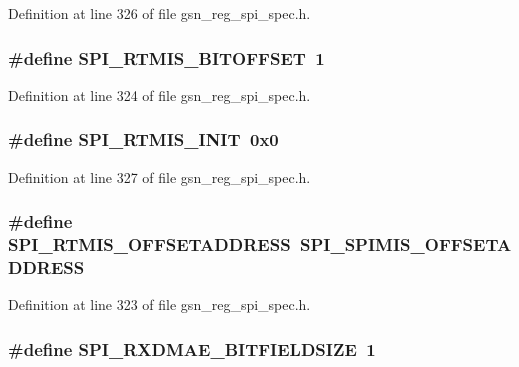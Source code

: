 Definition at line 326 of file gsn\_\-reg\_\-spi\_\-spec.h.

\hypertarget{a00573_a405ac4f8c1a2839580c374beb3ee0a61}{
\subsubsection[{SPI\_\-RTMIS\_\-BITOFFSET}]{\setlength{\rightskip}{0pt plus 5cm}\#define SPI\_\-RTMIS\_\-BITOFFSET~1}}
\label{a00573_a405ac4f8c1a2839580c374beb3ee0a61}


Definition at line 324 of file gsn\_\-reg\_\-spi\_\-spec.h.

\hypertarget{a00573_a476f42f80088901623eb6d094aa81ffd}{
\subsubsection[{SPI\_\-RTMIS\_\-INIT}]{\setlength{\rightskip}{0pt plus 5cm}\#define SPI\_\-RTMIS\_\-INIT~0x0}}
\label{a00573_a476f42f80088901623eb6d094aa81ffd}


Definition at line 327 of file gsn\_\-reg\_\-spi\_\-spec.h.

\hypertarget{a00573_a15ef02cf82b573bd110bbbbf13039f53}{
\subsubsection[{SPI\_\-RTMIS\_\-OFFSETADDRESS}]{\setlength{\rightskip}{0pt plus 5cm}\#define SPI\_\-RTMIS\_\-OFFSETADDRESS~SPI\_\-SPIMIS\_\-OFFSETADDRESS}}
\label{a00573_a15ef02cf82b573bd110bbbbf13039f53}


Definition at line 323 of file gsn\_\-reg\_\-spi\_\-spec.h.

\hypertarget{a00573_a9076b370ba9d8d252f666cfdbe258d84}{
\subsubsection[{SPI\_\-RXDMAE\_\-BITFIELDSIZE}]{\setlength{\rightskip}{0pt plus 5cm}\#define SPI\_\-RXDMAE\_\-BITFIELDSIZE~1}}
\label{a00573_a9076b370ba9d8d252f666cfdbe258d84}


